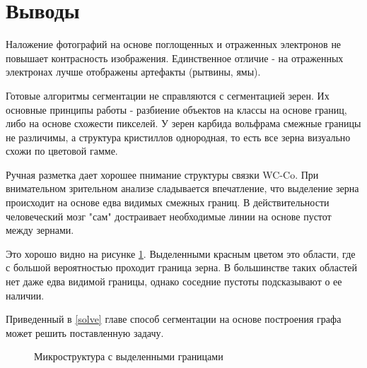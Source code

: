 \documentclass[a4paper, 14pt]{article}
\begin{document}
	\section{Выводы}
	Наложение фотографий на основе 
	поглощенных и отраженных электронов не повышает контрасность изображения. Единственное отличие - 
	на отраженных электронах лучше отображены артефакты (рытвины, ямы).
	
	Готовые алгоритмы сегментации не справляются с сегментацией зерен. Их основные принципы работы - 
	разбиение объектов на классы на основе границ, либо на основе схожести пикселей. У зерен 
	карбида вольфрама смежные границы не различимы, а структура кристиллов однородная, то есть все зерна 
	визуально схожи по цветовой гамме. 
	
	Ручная разметка дает хорошее пнимание структуры связки WC-Co. При внимательном зрительном анализе сладывается впечатление, что выделение зерна происходит на основе едва видимых смежных 
	границ. В действительности человеческий мозг "сам" достраивает необходимые линии на основе пустот между зернами. 
	
	Это хорошо видно на рисунке \ref{fig:grain_red}. Выделенными красным цветом это области, где с большой 
	вероятностью проходит граница зерна. В большинстве таких областей нет даже едва видимой границы, однако 
	соседние пустоты подсказывают о ее наличии. 
	
	Приведенный в \ref{solve} главе способ сегментации на основе построения графа может решить поставленную задачу. 
	
	\begin{figure}[h]
		\caption{Микроструктура с выделенными границами}
		\label{fig:grain_red}
	\end{figure}
	
\end{document}
